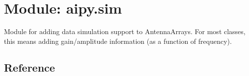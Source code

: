 \section{Module: aipy.sim}

Module for adding data simulation support to AntennaArrays.  For most classes,
this means adding gain/amplitude information (as a function of frequency).

\subsection{Reference}



